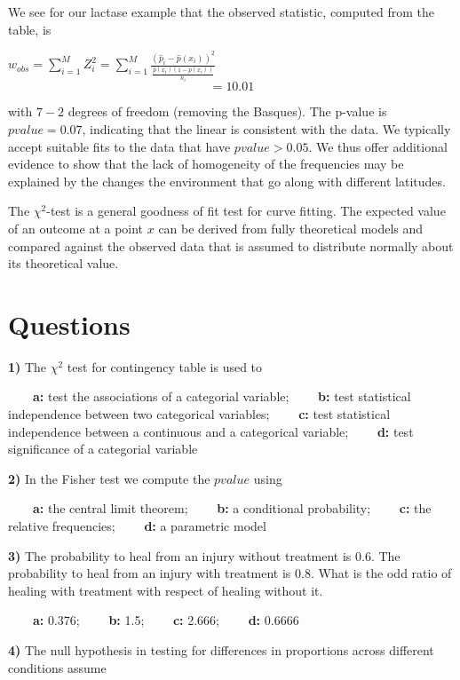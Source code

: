 \documentclass[
]{book}
\begin{document}
We see for our lactase example that the observed statistic, computed from the table, is

\(w_{obs}=\sum_{i=1}^M Z_i^2= \sum_{i=1}^M \frac{(\hat{p}_i-\hat{p}(x_i))^2}{\frac{\hat{p}(x_i)(1-\hat{p}(x_i))}{n_i}}\) \[=10.01\]

with \(7-2\) degrees of freedom (removing the Basques). The p-value is \(pvalue=0.07\), indicating that the linear is consistent with the data. We typically accept suitable fits to the data that have \(pvalue>0.05\). We thus offer additional evidence to show that the lack of homogeneity of the frequencies may be explained by the changes the environment that go along with different latitudes.

The \(\chi^2\)-test is a general goodness of fit test for curve fitting. The expected value of an outcome at a point \(x\) can be derived from fully theoretical models and compared against the observed data that is assumed to distribute normally about its theoretical value.

\hypertarget{questions-11}{%
\section{Questions}\label{questions-11}}

\textbf{1)} The \(\chi^2\) test for contingency table is used to

\textbf{\(\qquad\)a:} test the associations of a categorial variable;
\textbf{\(\qquad\)b:} test statistical independence between two categorical variables;
\textbf{\(\qquad\)c:} test statistical independence between a continuous and a categorical variable;
\textbf{\(\qquad\)d:} test significance of a categorial variable

\textbf{2)} In the Fisher test we compute the \(pvalue\) using

\textbf{\(\qquad\)a:} the central limit theorem;
\textbf{\(\qquad\)b:} a conditional probability;
\textbf{\(\qquad\)c:} the relative frequencies;
\textbf{\(\qquad\)d:} a parametric model

\textbf{3)} The probability to heal from an injury without treatment is 0.6. The probability to heal from an injury with treatment is 0.8. What is the odd ratio of healing with treatment with respect of healing without it.

\textbf{\(\qquad\)a:} 0.376;
\textbf{\(\qquad\)b:} 1.5;
\textbf{\(\qquad\)c:} 2.666;
\textbf{\(\qquad\)d:} 0.6666

\textbf{4)} The null hypothesis in testing for differences in proportions across different conditions assume
\end{document}

